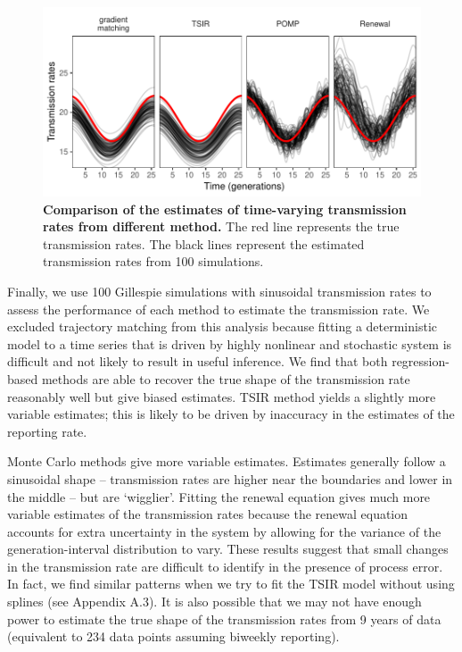 \documentclass{article}
\begin{document}
\begin{figure}[!t]
\includegraphics[width=\textwidth]{../figure/compare_transmission.pdf}
\caption{
\textbf{Comparison of the estimates of time-varying transmission rates from different method.}
The red line represents the true transmission rates.
The black lines represent the estimated transmission rates from 100 simulations.
}
\end{figure}
 
Finally, we use 100 Gillespie simulations with sinusoidal transmission rates to assess the performance of each method to estimate the transmission rate.
We excluded trajectory matching from this analysis because fitting a deterministic model to a time series that is driven by highly nonlinear and stochastic system is difficult and not likely to result in useful inference.
We find that both regression-based methods are able to recover the true shape of the transmission rate reasonably well but give biased estimates.
TSIR method yields a slightly more variable estimates; this is likely to be driven by inaccuracy in the estimates of the reporting rate. 

Monte Carlo methods give more variable estimates.
Estimates generally follow a sinusoidal shape -- transmission rates are higher near the boundaries and lower in the middle -- but are `wigglier'.
Fitting the renewal equation gives much more variable estimates of the transmission rates because the renewal equation accounts for extra uncertainty in the system by allowing for the variance of the generation-interval distribution to vary.
These results suggest that small changes in the transmission rate are difficult to identify in the presence of process error.
In fact, we find similar patterns when we try to fit the TSIR model without using splines (see Appendix A.3). It is also possible that we may not have enough power to estimate the true shape of the transmission rates from 9 years of data (equivalent to 234 data points assuming biweekly reporting).
\end{document}
